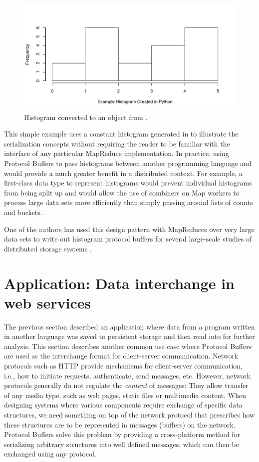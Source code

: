 \documentclass[article]{jss}
\begin{document}
%
\begin{figure}[t!]
  \centering
  \includegraphics{fig-021}
  \caption{Histogram converted to an  object from .}\label{figure}
\end{figure}

This simple example uses a constant histogram generated in
 to illustrate the serialization concepts without
requiring the reader to be familiar with the interface of any
particular MapReduce implementation.  In practice, using Protocol
Buffers to pass histograms between another programming language and
 would provide a much greater benefit in a distributed
context.  For example, a first-class data type to represent histograms
would prevent individual histograms from being split up and would
allow the use of combiners on Map workers to process large data sets
more efficiently than simply passing around lists of counts and
buckets.

One of the authors has used this design pattern with 
MapReduces over very large data sets to write out histogram protocol
buffers for several large-scale studies of distributed storage systems
\citep{sciencecloud,janus}.

\section{Application: Data interchange in web services}
\label{sec:opencpu}

The previous section described an application where data from a
program written in another language was saved to persistent storage
and then read into  for further analysis.  This section
describes another common use case where Protocol Buffers are used as
the interchange format for client-server communication.
Network protocols
such as HTTP provide mechanisms for client-server communication, i.e., how to
initiate requests, authenticate, send messages, etc.  However, network
protocols generally do not regulate the \emph{content} of messages: They
allow transfer of any media type, such as web pages, static files or
multimedia content.  When designing systems where various components require
exchange of specific data structures, we need something on top of the network
protocol that prescribes how these structures are to be represented in
messages (buffers) on the network. Protocol Buffers solve this
problem by providing a cross-platform method for serializing arbitrary
structures into well defined messages, which can then be exchanged using any
protocol.
\end{document}
